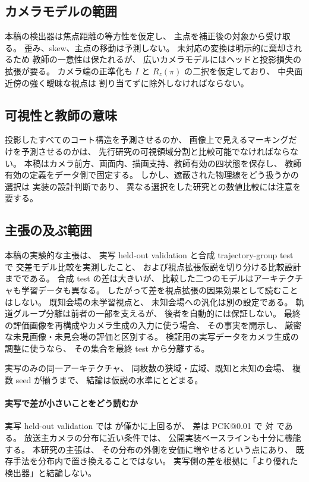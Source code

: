 \subsection{カメラモデルの範囲}
\label{sec:camera_model}

本稿の検出器は焦点距離の等方性を仮定し、
主点を補正後の対象から受け取る。
歪み、skew、主点の移動は予測しない。
未対応の変換は明示的に棄却されるため
教師の一意性は保たれるが、
広いカメラモデルにはヘッドと投影損失の拡張が要る。
カメラ端の正準化も
\(I\) と \(R_z(\pi)\) の二択を仮定しており、
中央面近傍の強く曖昧な視点は
割り当てずに除外しなければならない。

\subsection{可視性と教師の意味}
\label{sec:visibility_semantics}

投影したすべてのコート構造を予測させるのか、
画像上で見えるマーキングだけを予測させるのかは、
先行研究の可視領域分割と比較可能でなければならない。
本稿はカメラ前方、画面内、描画支持、教師有効の四状態を保存し、
教師有効の定義をデータ側で固定する。
しかし、遮蔽された物理線をどう扱うかの選択は
実装の設計判断であり、
異なる選択をした研究との数値比較には注意を要する。

\subsection{主張の及ぶ範囲}
\label{sec:claim_boundary}

本稿の実験的な主張は、
実写 held-out validation と合成 trajectory-group test で
交差モデル比較を実測したこと、
および視点拡張仮説を切り分ける比較設計までである。
合成 test の差は大きいが、
比較した二つのモデルはアーキテクチャも学習データも異なる。
したがって差を視点拡張の因果効果として読むことはしない。
既知会場の未学習視点と、
未知会場への汎化は別の設定である。
軌道グループ分離は前者の一部を支えるが、
後者を自動的には保証しない。
最終の評価画像を再構成やカメラ生成の入力に使う場合、
その事実を開示し、
厳密な未見画像・未見会場の評価と区別する。
検証用の実写データをカメラ生成の調整に使うなら、
その集合を最終 test から分離する。

実写のみの同一アーキテクチャ、
同枚数の狭域・広域、既知と未知の会場、
複数 seed が揃うまで、
結論は仮説の水準にとどまる。

\paragraph{実写で差が小さいことをどう読むか}
実写 held-out validation では \Method が僅かに上回るが、
差は PCK@0.01 で \resRealOursPckOne 対 \resRealTcdPckOne である。
放送主カメラの分布に近い条件では、
公開実装ベースラインも十分に機能する。
本研究の主張は、
その分布の外側を安価に増やせるという点にあり、
既存手法を分布内で置き換えることではない。
実写側の差を根拠に「より優れた検出器」と結論しない。

